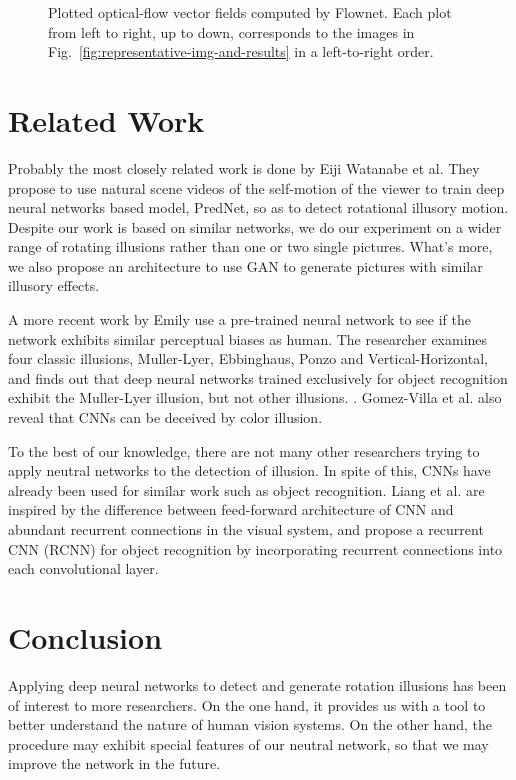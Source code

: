 \documentclass[journal]{IEEEtran}
\begin{document}
\begin{figure}
    \caption{Plotted optical-flow vector fields computed by Flownet. Each plot from left to right, up to down, corresponds to the images in Fig.~\ref{fig:representative-img-and-results} in a left-to-right order.}
    \label{fig:vector-fields}
  \end{figure}
  
  \section{Related Work}
  \label{sec:related}
  
  Probably the most closely related work is done by Eiji Watanabe et al. They propose to use natural scene videos of the self-motion of the viewer to train deep neural networks based model, PredNet, so as to detect rotational illusory motion. \cite{watanable2018illusory} Despite our work is based on similar networks, we do our experiment on a wider range of rotating illusions rather than one or two single pictures. What's more, we also propose an architecture to use GAN to generate pictures with similar illusory effects.
  
  
  A more recent work by Emily use a pre-trained neural network to see if the network exhibits similar perceptual biases as human. The researcher examines four classic illusions,  Muller-Lyer, Ebbinghaus,  Ponzo and Vertical-Horizontal, and finds out that deep neural networks trained exclusively for object recognition exhibit the Muller-Lyer illusion, but not other illusions. \cite{ward2019exploring} . Gomez-Villa et al. also reveal that CNNs can be deceived by color illusion. \cite{gomez2018convolutional} 
  
  To the best of our knowledge, there are not many other researchers trying to apply neutral networks to the detection of illusion. In spite of this, CNNs have already been used for similar work such as object recognition. Liang et al. are inspired by the difference between feed-forward  architecture of CNN and abundant recurrent connections in the visual system, and propose a recurrent CNN (RCNN) for object recognition by incorporating recurrent connections into each convolutional layer.\cite{liang2015recurrent}
  
  \section{Conclusion}
  \label{sec:conclusion}
  
  Applying deep neural networks to detect and generate rotation illusions has been of interest to more researchers. On the one hand, it provides us with a tool to better understand the nature of human vision systems. On the other hand, the procedure may exhibit special features of our neutral network, so that we may improve the network in the future.
\end{document}
